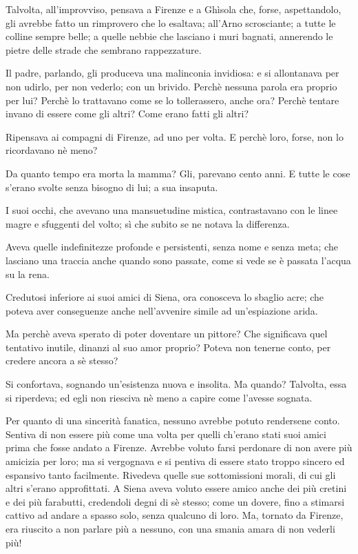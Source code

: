 Talvolta, all'improvviso, pensava a Firenze e a Ghìsola che, forse, aspettandolo, gli avrebbe fatto un rimprovero che lo esaltava; all'Arno scrosciante; a tutte le colline sempre belle; a quelle nebbie che lasciano i muri bagnati, annerendo le pietre delle strade che sembrano rappezzature.

Il padre, parlando, gli produceva una malinconia invidiosa: e si allontanava per non udirlo, per non vederlo; con un brivido. Perchè nessuna parola era proprio per lui? Perchè lo trattavano come se lo tollerassero, anche ora? Perchè tentare invano di essere come gli altri? Come erano fatti gli altri?

Ripensava ai compagni di Firenze, ad uno per volta. E perchè loro, forse, non lo ricordavano nè meno?

Da quanto tempo era morta la mamma? Gli, parevano cento anni. E tutte le cose s’erano svolte senza bisogno di lui; a sua insaputa.

I suoi occhi, che avevano una mansuetudine mistica, contrastavano con le linee magre e sfuggenti del volto; sì che subito se ne notava la differenza.

Aveva quelle indefinitezze profonde e persistenti, senza nome e senza meta; che lasciano una traccia anche quando sono passate, come si vede se è passata l’acqua su la rena.

Credutosi inferiore ai suoi amici di Siena, ora conosceva lo sbaglio acre; che poteva aver conseguenze anche nell’avvenire simile ad un’espiazione arida.

Ma perchè aveva sperato di poter doventare un pittore? Che significava quel tentativo inutile, dinanzi al suo amor proprio? Poteva non tenerne conto, per credere ancora a sè stesso?

Si confortava, sognando un’esistenza nuova e insolita. Ma quando? Talvolta, essa si riperdeva; ed egli non riesciva nè meno a capire come l’avesse sognata.

Per quanto di una sincerità fanatica, nessuno avrebbe potuto rendersene conto. Sentiva di non essere più come una volta per quelli ch’erano stati suoi amici prima che fosse andato a Firenze. Avrebbe voluto farsi perdonare di non avere più amicizia per loro; ma si vergognava e si pentiva di essere stato troppo sincero ed espansivo tanto facilmente. Rivedeva quelle sue sottomissioni morali, di cui gli altri s’erano approfittati. A Siena aveva voluto essere amico anche dei più cretini e dei più farabutti, credendoli degni di sè stesso; come un dovere, fino a stimarsi cattivo ad andare a spasso solo, senza qualcuno di loro. Ma, tornato da Firenze, era riuscito a non parlare più a nessuno, con una smania amara di non vederli più!

